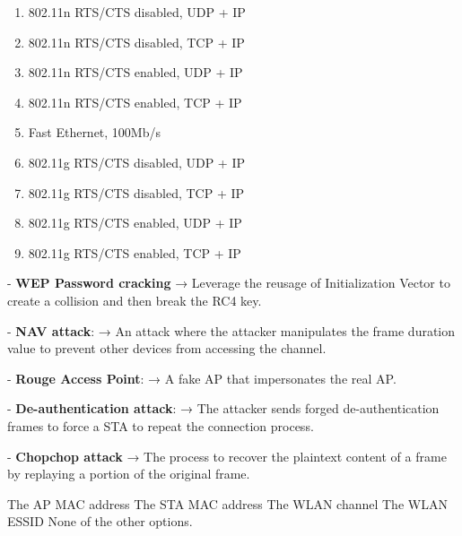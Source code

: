 \begin{questions}
    \begin{solution}
        \begin{enumerate}
            \item 802.11n RTS/CTS disabled, UDP + IP
            \item 802.11n RTS/CTS disabled, TCP + IP
            \item 802.11n RTS/CTS enabled, UDP + IP
            \item 802.11n RTS/CTS enabled, TCP + IP
            \item Fast Ethernet, 100Mb/s
            \item 802.11g RTS/CTS disabled, UDP + IP
            \item 802.11g RTS/CTS disabled, TCP + IP
            \item 802.11g RTS/CTS enabled, UDP + IP
            \item 802.11g RTS/CTS enabled, TCP + IP
        \end{enumerate}
    \end{solution}


    \begin{solution}
        - \textbf{WEP Password cracking} → Leverage the reusage of Initialization Vector to create a collision and then break the RC4 key.

        - \textbf{NAV attack}: → An attack where the attacker manipulates the frame duration value to prevent other devices from accessing the channel.

        - \textbf{Rouge Access Point}: → A fake AP that impersonates the real AP.

        - \textbf{De-authentication attack}: → The attacker sends forged de-authentication frames to force a STA to repeat the connection process.

        - \textbf{Chopchop attack} → The process to recover the plaintext content of a frame by replaying a portion of the original frame.
    \end{solution}



    \begin{checkboxes}
        \CorrectChoice The AP MAC address
        \CorrectChoice The STA MAC address
        \CorrectChoice The WLAN channel
        \choice The WLAN ESSID
        \choice None of the other options.
    \end{checkboxes}




\end{questions}

